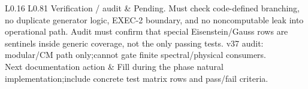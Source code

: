 \begin{longtable}{L{0.16\linewidth} L{0.81\linewidth}}
Verification /\allowbreak{} audit & Pending. Must check code-defined branching, no duplicate generator logic, EXEC-2 boundary, and no noncomputable leak into operational path. Audit must confirm that special Eisenstein/\allowbreak{}Gauss rows are sentinels inside generic coverage, not the only passing tests. v37 audit: modular/\allowbreak{}CM path only;\newline cannot gate finite spectral/\allowbreak{}physical consumers.\\
\hline\addlinespace[0.20em]
Next documentation action & Fill during the phase natural implementation;\newline include concrete test matrix rows and pass/\allowbreak{}fail criteria.\\
\hline\addlinespace[0.20em]
\end{longtable}

